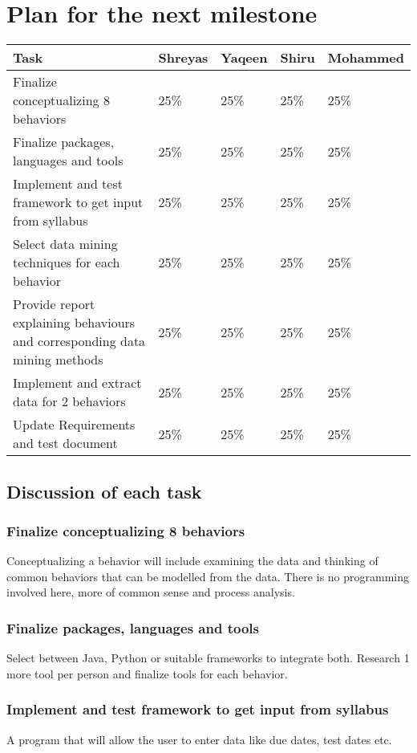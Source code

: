 \documentclass[12pt]{article}
\begin{document}
	\section{Plan for the next milestone}
	\begin{tabularx}{\linewidth}{|X|X|X|X|X|}
	\hline
		\textbf{Task} & \textbf{Shreyas} & \textbf{Yaqeen} & \textbf{Shiru} & \textbf{Mohammed} \\
		\hline
		Finalize conceptualizing 8 behaviors & 25\% & 25\% & 25\% & 25\% \\ \hline
		Finalize packages, languages and tools & 25\% & 25\% & 25\% & 25\% \\ \hline
		Implement and test framework to get input from syllabus & 25\% & 25\% & 25\% & 25\%\\ \hline
		Select data mining techniques for each behavior & 25\% & 25\% & 25\% & 25\% \\ \hline
		Provide report explaining behaviours and corresponding data mining methods &25\% & 25\% & 25\% & 25\%\\ \hline
		Implement and extract data for 2 behaviors &25\% & 25\% & 25\% & 25\%\\ \hline
		Update Requirements and test document & 25\% & 25\% & 25\% & 25\%\\ 
		\hline
	\end{tabularx}

	\subsection{Discussion of each task}
	\subsubsection{Finalize conceptualizing 8 behaviors } \label{behs}
	Conceptualizing a behavior will include examining the data and thinking of common behaviors that can be modelled from the data. There is no programming involved here, more of common sense and process analysis.
	\subsubsection{Finalize packages, languages and tools}
	Select between Java, Python or suitable frameworks to integrate both. Research 1 more tool per person and finalize tools for each behavior. 
	\subsubsection{Implement and test framework to get input from syllabus}
	A program that will allow the user to enter data like due dates, test dates etc.
\end{document}
